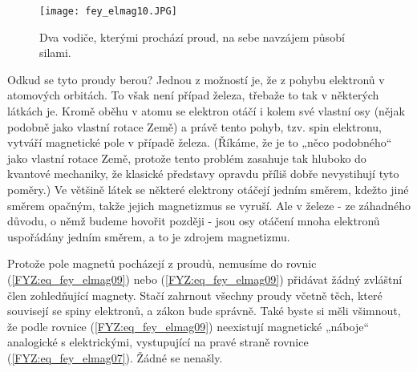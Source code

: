     \begin{figure}
      \centering
      \texttt{[image: fey\_elmag10.JPG]}
      \caption{Dva vodiče, kterými prochází proud, na sebe navzájem působí silami.}
      \label{fyz:fig_fey_elmag10}   
    \end{figure}
    
    Odkud se tyto proudy berou? Jednou z možností je, že z pohybu elektronů v atomových orbitách. To však 
    není případ železa, třebaže to tak v některých látkách je. Kromě oběhu v atomu se elektron otáčí i 
    kolem své vlastní osy (nějak podobně jako vlastní rotace Země) a právě tento pohyb, tzv. spin 
    elektronu, vytváří magnetické pole v případě železa. (Říkáme, že je to „něco podobného“ jako vlastní 
    rotace Země, protože tento problém zasahuje tak hluboko do kvantové mechaniky, že klasické představy 
    opravdu příliš dobře nevystihují tyto poměry.) Ve většině látek se některé elektrony otáčejí jedním 
    směrem, kdežto jiné směrem opačným, takže jejich magnetizmus se vyruší. Ale v železe - ze záhadného 
    důvodu, o němž budeme hovořit později - jsou osy otáčení mnoha elektronů uspořádány jedním směrem, a to 
    je zdrojem magnetizmu.         
    
    Protože pole magnetů pocházejí z proudů, nemusíme do rovnic (\ref{FYZ:eq_fey_elmag09}) nebo
    (\ref{FYZ:eq_fey_elmag09}) přidávat žádný zvláštní člen zohledňující magnety. Stačí zahrnout všechny 
    proudy včetně těch, které souvisejí se spiny elektronů, a zákon bude správně. Také byste si měli 
    všimnout, že podle rovnice (\ref{FYZ:eq_fey_elmag09}) neexistují magnetické „náboje“ analogické s 
    elektrickými, vystupující na pravé straně rovnice (\ref{FYZ:eq_fey_elmag07}). Žádné se nenašly.
        
